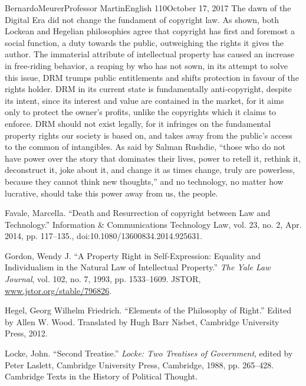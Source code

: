 \documentclass[12pt,letterpaper]{article}
\begin{document}
\begin{mla}{Bernardo}{Meurer}{Professor Martin}{English 110}{October 17, 2017}
        The dawn of the Digital Era did not change the fundament of copyright law. As shown, both Lockean and Hegelian philosophies agree that copyright has first and foremost a social function, a duty towards the public, outweighing the rights it gives the author. The immaterial attribute of intellectual property has caused an increase in free-riding behavior, a reaping by who has not sown, in its attempt to solve this issue, DRM trumps public entitlements and shifts protection in favour of the rights holder. DRM in its current state is fundamentally anti-copyright, despite its intent, since its interest and value are contained in the market, for it aims only to protect the owner's profits, unlike the copyrights which it claims to enforce. DRM should not exist legally, for it infringes on the fundamental property rights our society is based on, and takes away from the public's access to the common of intangibles. As said by Salman Rushdie, ``those who do not have power over the story that dominates their lives, power to retell it, rethink it, deconstruct it, joke about it, and change it as times change, truly are powerless, because they cannot think new thoughts,'' and no technology, no matter how lucrative, should take this power away from us, the people.
        

        \begin{workscited}
            \bibent
            Favale, Marcella. ``Death and Resurrection of copyright between Law and Technology.'' Information \& Communications Technology Law, vol. 23, no. 2, Apr. 2014, pp. 117–135., doi:10.1080/13600834.2014.925631. 

            \bibent
            Gordon, Wendy J. ``A Property Right in Self-Expression: Equality and Individualism in the Natural Law of Intellectual Property.'' \textit{The Yale Law Journal}, vol. 102, no. 7, 1993, pp. 1533–1609. JSTOR, \url{www.jstor.org/stable/796826}.

            \bibent
            Hegel, Georg Wilhelm Friedrich. ``Elements of the Philosophy of Right.'' Edited by Allen W. Wood. Translated by Hugh Barr Nisbet, Cambridge University Press, 2012.

            \bibent 
            Locke, John. ``Second Treatise.'' \textit{Locke: Two Treatises of Government}, edited by Peter Laslett, Cambridge University Press, Cambridge, 1988, pp. 265–428. Cambridge Texts in the History of Political Thought.


\end{workscited}
\end{mla}
\end{document}

